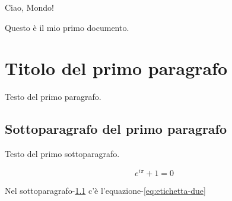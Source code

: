 \documentclass{article}
\begin{document}
Ciao, Mondo!

Questo è il mio primo documento.

\section{Titolo del primo paragrafo}

Testo del primo paragrafo.

\subsection{Sottoparagrafo del primo paragrafo}
\label{subsec:etichetta-uno}

Testo del primo sottoparagrafo.

\begin{equation}
    e^{i\pi}+1 = 0
\label{eq:etichetta-due}
\end{equation}

Nel sottoparagrafo-\ref{subsec:etichetta-uno}
c'è l'equazione-\ref{eq:etichetta-due}
\end{document}
